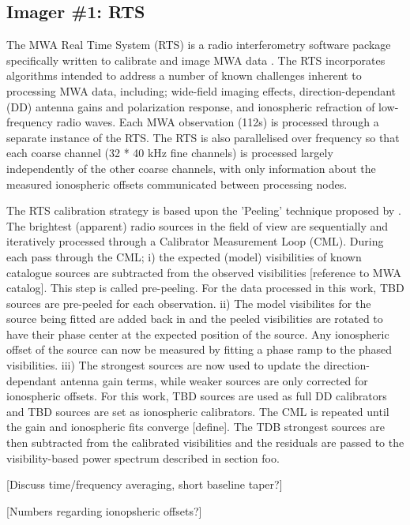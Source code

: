 \subsection{Imager \#1: RTS}
The MWA Real Time System (RTS) is a radio interferometry software package specifically written to calibrate and image MWA data \citep[][Mitchell et al. in prep]{dale_Cappallo_Morales_Ord_2008}. The RTS incorporates algorithms intended to address a number of known challenges inherent to processing MWA data, including; wide-field imaging effects, direction-dependant (DD) antenna gains and polarization response, and ionospheric refraction of low-frequency radio waves. Each MWA observation (112s) is processed through a separate instance of the RTS. The RTS is also parallelised over frequency so that each coarse channel (32 * 40 kHz fine channels) is processed largely independently of the other coarse channels, with only information about the measured ionospheric offsets communicated between processing nodes.  

The RTS calibration strategy is based upon the 'Peeling' technique proposed by \citet{Noordam_2004}. The brightest (apparent) radio sources in the field of view are sequentially and iteratively processed through a Calibrator Measurement Loop (CML). During each pass through the CML; i) the expected (model) visibilities of known catalogue sources are subtracted from the observed visibilities [reference to MWA catalog]. This step is called pre-peeling. For the data processed in this work, TBD sources are pre-peeled for each observation. ii) The model visibilites for the source being fitted are added back in and the peeled visibilities are rotated to have their phase center at the expected position of the source. Any ionospheric offset of the source can now be measured by fitting a phase ramp to the phased visibilities. iii) The strongest sources are now used to update the direction-dependant antenna gain terms, while weaker sources are only corrected for ionospheric offsets. For this work, TBD sources are used as full DD calibrators and TBD sources are set as ionospheric calibrators. The CML is repeated until the gain and ionospheric fits converge [define]. The TDB strongest sources are then subtracted from the calibrated visibilities and the residuals are passed to the visibility-based power spectrum described in section foo.

[Discuss time/frequency averaging, short baseline taper?]

[Numbers regarding ionopsheric offsets?]


